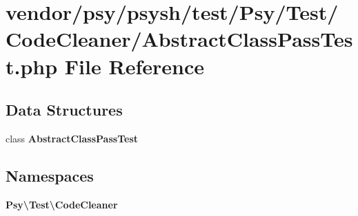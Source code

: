 \section{vendor/psy/psysh/test/\+Psy/\+Test/\+Code\+Cleaner/\+Abstract\+Class\+Pass\+Test.php File Reference}
\label{_abstract_class_pass_test_8php}
\subsection*{Data Structures}
\begin{DoxyCompactItemize}
\item 
class {\bf Abstract\+Class\+Pass\+Test}
\end{DoxyCompactItemize}
\subsection*{Namespaces}
\begin{DoxyCompactItemize}
\item 
 {\bf Psy\textbackslash{}\+Test\textbackslash{}\+Code\+Cleaner}
\end{DoxyCompactItemize}
